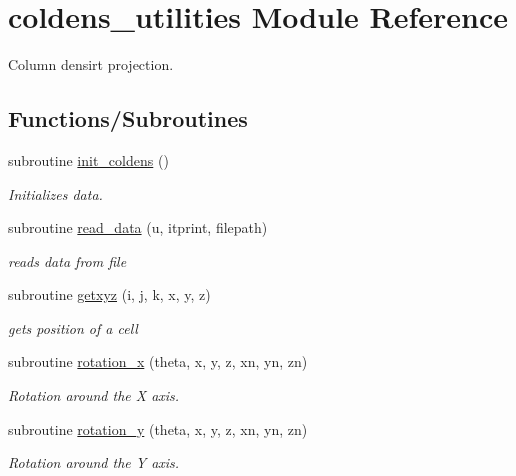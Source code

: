 \hypertarget{namespacecoldens__utilities}{}\section{coldens\+\_\+utilities Module Reference}
\label{namespacecoldens__utilities}


Column densirt projection.  


\subsection*{Functions/\+Subroutines}
\begin{DoxyCompactItemize}
\item 
subroutine \hyperlink{namespacecoldens__utilities_a9fa20a511c2b17a33fdb8fc1b3bf55a2}{init\+\_\+coldens} ()
\begin{DoxyCompactList}\small\item\em Initializes data. \end{DoxyCompactList}\item 
subroutine \hyperlink{namespacecoldens__utilities_a2dafe54f1edb888f313949f4f801e2d6}{read\+\_\+data} (u, itprint, filepath)
\begin{DoxyCompactList}\small\item\em reads data from file \end{DoxyCompactList}\item 
subroutine \hyperlink{namespacecoldens__utilities_a7df7ce1cf8187ca5393dc35effa22020}{getxyz} (i, j, k, x, y, z)
\begin{DoxyCompactList}\small\item\em gets position of a cell \end{DoxyCompactList}\item 
subroutine \hyperlink{namespacecoldens__utilities_af7f94bfb5ffee491708d3f221915abcf}{rotation\+\_\+x} (theta, x, y, z, xn, yn, zn)
\begin{DoxyCompactList}\small\item\em Rotation around the X axis. \end{DoxyCompactList}\item 
subroutine \hyperlink{namespacecoldens__utilities_a989fb82adc69b6b1c00a2d2400c9854a}{rotation\+\_\+y} (theta, x, y, z, xn, yn, zn)
\begin{DoxyCompactList}\small\item\em Rotation around the Y axis. \end{DoxyCompactList}\item 

\end{DoxyCompactItemize}

